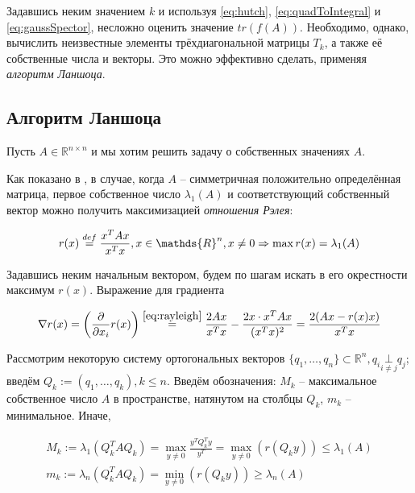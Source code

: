 Задавшись неким значением $k$ и используя \eqref{eq:hutch}, \eqref{eq:quadToIntegral} и \eqref{eq:gaussSpector}, несложно оценить значение $ tr(f(A)) $.
Необходимо, однако, вычислить неизвестные элементы трёхдиагональной матрицы $ T_k $, а также её собственные числа и векторы.
Это можно эффективно сделать, применяя \emph{алгоритм Ланшоца}.

\subsection{Алгоритм Ланшоца}

Пусть $ A \in \mathds{R}^{n \times n} $ и мы хотим решить задачу о собственных значениях $ A $.

Как показано в \cite{golub2013matcomput}, в случае, когда $ A $ -- симметричная положительно определённая матрица, %
первое собственное число $ \lambda_1(A) $ и соответствующий собственный вектор можно получить максимизацией \emph{отношения Рэлея}:

\begin{equation}\label{eq:rayleigh}
    r(x) \defeq \frac{x^T A x}{x^T x}, x \in \mathds{R}^n, x \ne 0 \Rightarrow \max r(x) = \lambda_1(A)
\end{equation}

Задавшись неким начальным вектором, будем по шагам искать в его окрестности максимум $ r(x) $.
Выражение для градиента

\begin{equation}\label{eq:rayleighGrad}
    \nabla r(x) = \left( \frac{\partial}{\partial x_i} r(x) \right) \overset{\eqref{eq:rayleigh}}= \frac{2Ax}{x^Tx} - \frac{2x \cdot x^T Ax}{(x^Tx)^2} = \frac{2(Ax-r(x)x)}{x^Tx}
\end{equation}

Рассмотрим некоторую систему ортогональных векторов $ \{ q_1, \dots, q_n \} \subset \mathds R ^n, q_i \underset{i \ne j}\bot q_j $; введём $ Q_k := (q_1, \dots, q_k), k \le n $.
Введём обозначения: $ M_k $ -- максимальное собственное число $ A $ в пространстве, натянутом на столбцы $ Q_k $, $ m_k $ -- минимальное.
Иначе,

\begin{gather}
    \label{eq:Mk}
    M_k := \lambda_1(Q_k^T A Q_k) = \max_{ y \ne 0 } \frac{ y^T Q_k^T y}{y^T} = \max_{ y \ne 0 } (r(Q_k y)) \le \lambda_1(A) \\
    \label{eq:mk}
    m_k := \lambda_n (Q_k^T A Q_k) = \min_{ y \ne 0 }(r(Q_k y)) \ge \lambda_n(A)
\end{gather}

